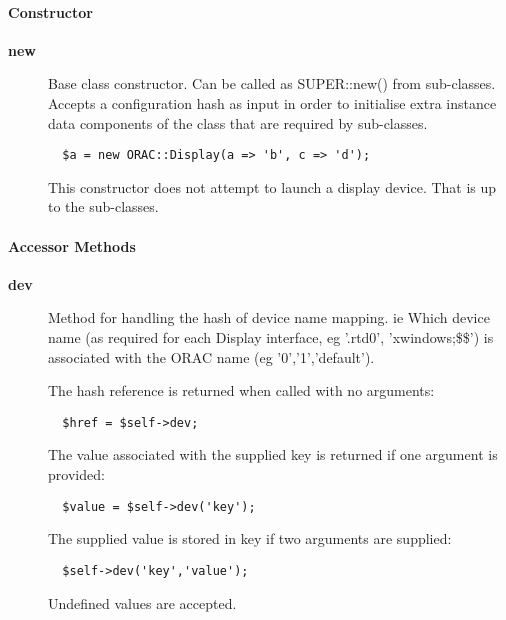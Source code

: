 \paragraph*{Constructor\label{ORAC::Display::Base_Constructor}}
\begin{description}

\item[{\textbf{new}}] \mbox{}

Base class constructor. Can be called as SUPER::new() from
sub-classes. Accepts a configuration hash as input in order to
initialise extra instance data components of the class that are
required by sub-classes.

\begin{verbatim}
  $a = new ORAC::Display(a => 'b', c => 'd');
\end{verbatim}


This constructor does not attempt to launch a display device.
That is up to the sub-classes.

\end{description}
\paragraph*{Accessor Methods\label{ORAC::Display::Base_Accessor_Methods}}
\begin{description}

\item[{\textbf{dev}}] \mbox{}

Method for handling the hash of device name mapping. ie Which
device name (as required for each Display interface, eg '.rtd0',
'xwindows;\$\$') is associated with the ORAC name (eg '0','1','default').



The hash reference is returned when called with no arguments:

\begin{verbatim}
  $href = $self->dev;
\end{verbatim}


The value associated with the supplied key is returned if one
argument is provided:

\begin{verbatim}
  $value = $self->dev('key');
\end{verbatim}


The supplied value is stored in key if two arguments are supplied:

\begin{verbatim}
  $self->dev('key','value');
\end{verbatim}


Undefined values are accepted.

\end{description}
